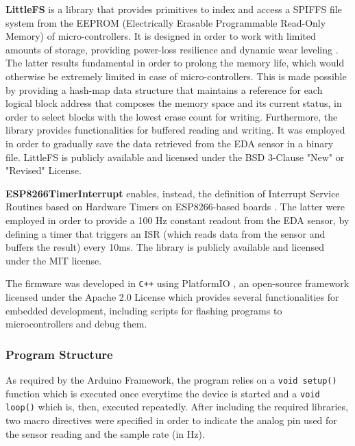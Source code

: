 \textbf{LittleFS} is a library that provides primitives to index and access a SPIFFS file system from the EEPROM (Electrically Erasable Programmable Read-Only Memory) of micro-controllers. It is designed in order to work with limited amounts of storage, providing power-loss resilience and dynamic wear leveling \cite{littlefs}. The latter results fundamental in order to prolong the memory life, which would otherwise be extremely limited in case of micro-controllers. This is made possible by providing a hash-map data structure that maintains a reference for each logical block address that composes the memory space and its current status, in order to select blocks with the lowest erase count for writing. Furthermore, the library provides functionalities for buffered reading and writing. It was employed in order to gradually save the data retrieved from the EDA sensor in a binary file.
LittleFS is publicly available and licensed under the BSD 3-Clause "New" or "Revised" License.

\vspace{8mm}

\textbf{ESP8266TimerInterrupt} enables, instead, the definition of Interrupt Service Routines based on Hardware Timers on ESP8266-based boards \cite{esp8266timerinterrupt}. The latter were employed in order to provide a 100 Hz constant readout from the EDA sensor, by defining a timer that triggers an ISR (which reads data from the sensor and buffers the result) every 10ms. The library is publicly available and licensed under the MIT license.

\vspace{8mm}

The firmware was developed in \texttt{C++} using PlatformIO \cite{platformio}, an open-source framework licensed under the Apache 2.0 License which provides several functionalities for embedded development, including scripts for flashing programs to microcontrollers and debug them.

\subsubsection{Program Structure}\label{subsubsec:program-structure}

As required by the Arduino Framework, the program relies on a \texttt{void setup()} function which is executed once everytime the device is started and a \texttt{void loop()} which is, then, executed repeatedly. After including the required libraries, two macro directives were specified in order to indicate the analog pin used for the sensor reading and the sample rate (in Hz).

